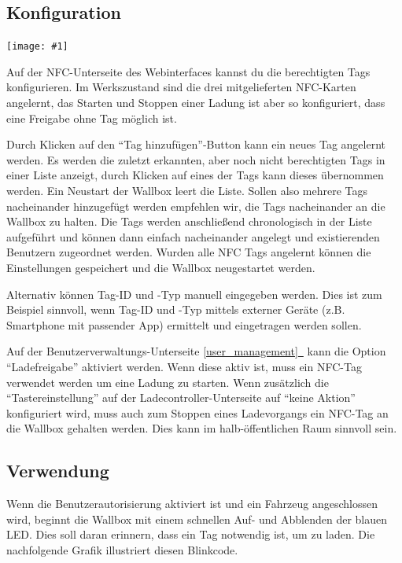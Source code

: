 \documentclass[a4paper,10pt]{article}
\newcommand{\gfx}[1]{\texttt{[image: \#1]}}
\newcommand*{\fullref}[1]{\hyperref[{#1}]{\ref*{#1}~\nameref*{#1}}}
\begin{document}
\begin{multicols*}{2}
	\subsection{Konfiguration}
	\gfx{./img_warp2/resized/web_nfc}

	Auf der NFC-Unterseite des Webinterfaces kannst du die berechtigten Tags konfigurieren.
	Im Werkszustand sind die drei mitgelieferten NFC-Karten angelernt,
	das Starten und Stoppen einer Ladung ist aber so konfiguriert, dass eine
	Freigabe ohne Tag möglich ist.

	Durch Klicken auf den \enquote{Tag hinzufügen}-Button kann ein neues Tag angelernt werden.
	Es werden die zuletzt erkannten, aber noch nicht berechtigten Tags in einer
	Liste anzeigt, durch Klicken auf eines der Tags kann dieses übernommen werden. Ein Neustart der
	Wallbox leert die Liste. Sollen also mehrere Tags nacheinander hinzugefügt
	werden empfehlen wir, die Tags nacheinander an die Wallbox zu halten. Die
	Tags werden anschließend chronologisch in der Liste aufgeführt und können
	dann einfach nacheinander angelegt und existierenden Benutzern zugeordnet
	werden. Wurden alle NFC Tags angelernt können die Einstellungen gespeichert und die
	Wallbox neugestartet werden.

	\columnbreak

	Alternativ können Tag-ID und -Typ manuell eingegeben werden. Dies ist zum Beispiel sinnvoll,
	wenn Tag-ID und -Typ mittels externer Geräte (z.B. Smartphone mit passender
	App) ermittelt und eingetragen werden sollen.

	Auf der Benutzerverwaltungs-Unterseite \fullref{user_management} kann die Option \enquote{Ladefreigabe} aktiviert werden.
	Wenn diese aktiv ist, muss ein NFC-Tag verwendet werden um eine Ladung zu starten.
	Wenn zusätzlich die \enquote{Tastereinstellung} auf der Ladecontroller-Unterseite auf \enquote{keine Aktion} konfiguriert wird,
	muss auch zum Stoppen eines Ladevorgangs ein NFC-Tag an die Wallbox gehalten werden. Dies kann im
	halb-öffentlichen Raum sinnvoll sein.


	\subsection{Verwendung}
	Wenn die Benutzerautorisierung aktiviert ist und ein Fahrzeug angeschlossen wird,
	beginnt die Wallbox mit einem schnellen Auf- und Abblenden der blauen LED.
	Dies soll daran erinnern, dass ein Tag notwendig ist, um zu laden. Die
	nachfolgende Grafik illustriert diesen Blinkcode.


\end{multicols*}
\end{document}
